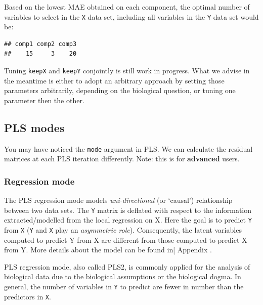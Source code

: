 \documentclass[]{book}
\newenvironment{Shaded}{\begin{snugshade}}{\end{snugshade}}
\newcommand{\NormalTok}[1]{#1}
\newcommand{\OperatorTok}[1]{\textcolor[rgb]{0.81,0.36,0.00}{\textbf{#1}}}
\begin{document}
Based on the lowest MAE obtained on each component, the optimal number of variables to select in the \texttt{X} data set, including all variables in the \texttt{Y} data set would be:

\begin{Shaded}
\end{Shaded}

\begin{verbatim}
## comp1 comp2 comp3 
##    15     3    20
\end{verbatim}

Tuning \texttt{keepX} and \texttt{keepY} conjointly is still work in progress. What we advise in the meantime is either to adopt an arbitrary approach by setting those parameters arbitrarily, depending on the biological question, or tuning one parameter then the other.

\hypertarget{PLS:details}{%
\subsection{PLS modes}\label{PLS:details}}

You may have noticed the \texttt{mode} argument in PLS. We can calculate the residual matrices at each PLS iteration differently. Note: this is for \textbf{advanced} users.

\hypertarget{regression-mode}{%
\subsubsection{Regression mode}\label{regression-mode}}

The PLS regression mode models \emph{uni-directional} (or `causal') relationship between two data sets. The \texttt{Y} matrix is deflated with respect to the information extracted/modelled from the local regression on X. Here the goal is to predict \texttt{Y} from \texttt{X} (\texttt{Y} and \texttt{X} play an \emph{asymmetric role}). Consequently, the latent variables computed to predict Y from X are different from those computed to predict X from Y. More details about the model can be found in{[} Appendix \citep{Lec08}.

PLS regression mode, also called PLS2, is commonly applied for the analysis of biological data \citep{Bou05, Byl07} due to the biological assumptions or the biological dogma. In general, the number of variables in \texttt{Y} to predict are fewer in number than the predictors in \texttt{X}.
\end{document}
